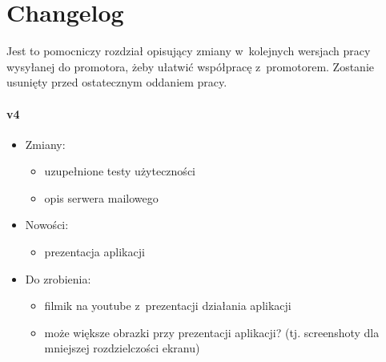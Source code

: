 \chapter*{Changelog}\label{ch:changelog}

Jest to pomocniczy rozdział opisujący zmiany w~kolejnych wersjach pracy wysyłanej do promotora, żeby ułatwić współpracę z~promotorem.
Zostanie usunięty przed ostatecznym oddaniem pracy.

\subsubsection{v4}
\begin{itemize}
\item Zmiany:
    \begin{itemize}
    	\item uzupełnione testy użyteczności
    	\item opis serwera mailowego
	\end{itemize}
\item Nowości:
    \begin{itemize}
		\item prezentacja aplikacji
	\end{itemize}
\item Do zrobienia:
    \begin{itemize}
        \item filmik na youtube z~prezentacji działania aplikacji
        \item może większe obrazki przy prezentacji aplikacji? (tj. screenshoty dla mniejszej rozdzielczości ekranu)
    \end{itemize}
\end{itemize}

